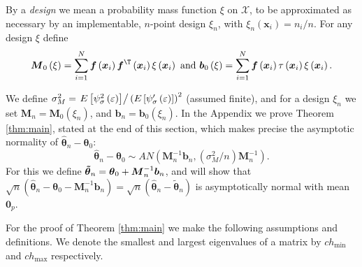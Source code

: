 \documentclass[times, authoryear, 12pt, twoside]{elsarticle}
\begin{document}
By a \textit{design} we mean a probability mass function $\xi$ on $\mathcal{X}$, to be approximated as necessary by an implementable, $n$-point design $\xi_{n}$, with $\xi_{n}(\boldsymbol{x}_{i})=n_{i}/n$. For any design $\xi$ define 
\begin{equation*}
\boldsymbol{M}_{0}\left( \xi \right) =\sum_{i=1}^{N}\boldsymbol{f}%
\left( \boldsymbol{x}_{i}\right) \boldsymbol{f}^{\T }\left( \boldsymbol{x}_{i}%
\right) \xi \left( \boldsymbol{x}_{i}\right) \text{ and }\boldsymbol{b}%
_{0}\left( \xi \right) =\sum_{i=1}^{N}\boldsymbol{f}%
\left( \boldsymbol{x}_{i}\right) \tau\left( \boldsymbol{x}_{i}%
\right) \xi \left( \boldsymbol{x}_{i}\right) . 
\end{equation*}

We define $\sigma _{M}^{2}=\left. E\left[ \psi _{\sigma }^{2}\left(
\varepsilon \right) \right] \right/ \left( E\left[ \psi _{\sigma }^{\prime
}\left( \varepsilon \right) \right] \right) ^{2}$ (assumed finite), 
and for a design $\xi _{n}$ we set 
$\boldsymbol{M}_{n}=\boldsymbol{M}_{0}\left( \xi _{n}\right) $, and 
$\boldsymbol{b}_{n}=\boldsymbol{b}_{0}\left( \xi _{n}\right) $. In the
Appendix we prove Theorem \ref{thm:main}, stated at the end of this section,
which makes precise the asymptotic normality of $\boldsymbol{\hat{\theta}}%
_{n}-\boldsymbol{\theta }_{0}$:%
\begin{equation}
\boldsymbol{\hat{\theta}}_{n}-\boldsymbol{\theta }_{0}\sim AN\left( 
\boldsymbol{M}_{n}^{-1}\boldsymbol{b}_{n},\left( \sigma
_{M}^{2}/n\right) \boldsymbol{M}_{n}^{-1}\right) .  \label{AN}
\end{equation}%
\noindent For this we define $\boldsymbol{\tilde{\theta}}_{n}=\boldsymbol{%
\theta }_{0}+\boldsymbol{M}_{n}^{-1}\boldsymbol{b}_{n}$, and will show
that $\sqrt{n}\left( \boldsymbol{\hat{\theta}}_{n}-\boldsymbol{\theta }_{0}-%
\boldsymbol{M}_{n}^{-1}\boldsymbol{b}_{n}\right) =\sqrt{n}\left( 
\boldsymbol{\hat{\theta}}_{n}-\boldsymbol{\tilde{\theta}}_{n}\right) $ is
asymptotically normal with mean $\boldsymbol{0}_p$.

For the proof of Theorem \ref{thm:main} we make the following assumptions
and definitions. We denote the smallest and largest eigenvalues of a matrix
by $ch_{\min }$ and $ch_{\max }$ respectively.
\end{document}
